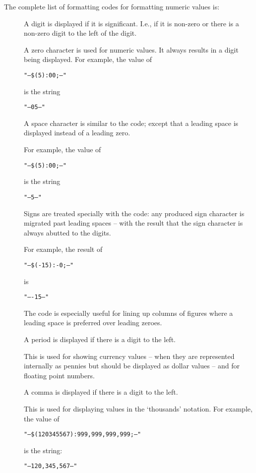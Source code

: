 The complete list of formatting codes for formatting numeric values is:

\begin{description}
\item[] A digit is displayed if it is significant. I.e., if it is non-zero or there is a non-zero digit to the left of the digit.
\item[] A zero character is used for numeric values. It always results in a digit being displayed. For example, the value of
\begin{alltt}
"--\$(5):00;--"
\end{alltt}
is the string
\begin{alltt}
"--05--"
\end{alltt}

\item[\q{\spce{}}] A space character is similar to the  code; except that a leading space is displayed instead of a leading zero. 

For example, the value of
\begin{alltt}
"--\$(5):00;--"
\end{alltt}
is the string
\begin{alltt}
"-- 5--"
\end{alltt}

\begin{aside}
Signs are treated specially with the \q{\spce{}} code: any produced sign character is migrated past leading spaces -- with the result that the sign character is always abutted to the digits.

For example, the result of
\begin{alltt}
"--\$(-15):-   0;--"
\end{alltt}
is
\begin{alltt}
"--  -15--"
\end{alltt}
The \q{\spce{}} code is especially useful for lining up columns of figures where a leading space is preferred over leading zeroes.
\end{aside}

\item[] A period is displayed if there is a digit to the left.

This is used for showing currency values -- when they are represented internally as pennies but should be displayed as dollar values -- and for floating point numbers.
\item[\q{,}] A comma is displayed if there is a digit to the left. 

This is used for displaying values in the `thousands' notation. For example, the value of
\begin{alltt}
"--\$(120345567):999,999,999,999;--"
\end{alltt}
is the string:
\begin{alltt}
"--120,345,567--"
\end{alltt}


\end{description}
